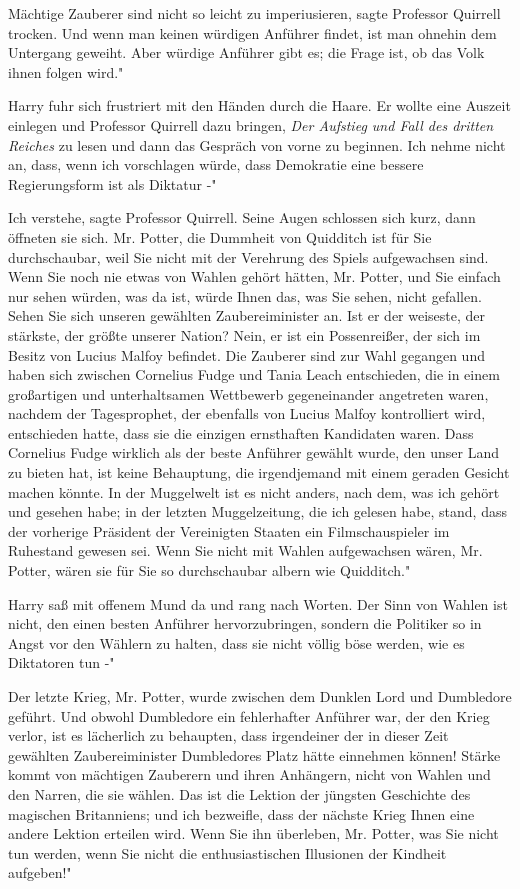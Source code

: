 \glqq{}Mächtige Zauberer sind nicht so leicht zu imperiusieren\grqq{}, sagte
Professor Quirrell trocken. \glqq{}Und wenn man keinen würdigen Anführer findet,
ist man ohnehin dem Untergang geweiht. Aber würdige Anführer gibt es; die Frage
ist, ob das Volk ihnen folgen wird."

Harry fuhr sich frustriert mit den Händen durch die Haare. Er wollte eine
Auszeit einlegen und Professor Quirrell dazu bringen, \emph{Der Aufstieg und
Fall des dritten Reiches} zu lesen und dann das Gespräch von vorne zu beginnen.
\glqq{}Ich nehme nicht an, dass, wenn ich vorschlagen würde, dass Demokratie eine
bessere Regierungsform ist als Diktatur -"

\glqq{}Ich verstehe\grqq{}, sagte Professor Quirrell. Seine Augen schlossen sich
kurz, dann öffneten sie sich. \glqq{}Mr. Potter, die Dummheit von Quidditch ist
für Sie durchschaubar, weil Sie nicht mit der Verehrung des Spiels aufgewachsen
sind. Wenn Sie noch nie etwas von Wahlen gehört hätten, Mr. Potter, und Sie
einfach nur sehen würden, was da ist, würde Ihnen das, was Sie sehen, nicht
gefallen. Sehen Sie sich unseren gewählten Zaubereiminister an. Ist er der
weiseste, der stärkste, der größte unserer Nation? Nein, er ist ein
Possenreißer, der sich im Besitz von Lucius Malfoy befindet. Die Zauberer sind
zur Wahl gegangen und haben sich zwischen Cornelius Fudge und Tania Leach
entschieden, die in einem großartigen und unterhaltsamen Wettbewerb
gegeneinander angetreten waren, nachdem der Tagesprophet, der ebenfalls von
Lucius Malfoy kontrolliert wird, entschieden hatte, dass sie die einzigen
ernsthaften Kandidaten waren. Dass Cornelius Fudge wirklich als der beste
Anführer gewählt wurde, den unser Land zu bieten hat, ist keine Behauptung, die
irgendjemand mit einem geraden Gesicht machen könnte. In der Muggelwelt ist es
nicht anders, nach dem, was ich gehört und gesehen habe; in der letzten
Muggelzeitung, die ich gelesen habe, stand, dass der vorherige Präsident der
Vereinigten Staaten ein Filmschauspieler im Ruhestand gewesen sei. Wenn Sie
nicht mit Wahlen aufgewachsen wären, Mr. Potter, wären sie für Sie so
durchschaubar albern wie Quidditch."

Harry saß mit offenem Mund da und rang nach Worten. \glqq{}Der Sinn von Wahlen
ist nicht, den einen besten Anführer hervorzubringen, sondern die Politiker so
in Angst vor den Wählern zu halten, dass sie nicht völlig böse werden, wie es
Diktatoren tun -"

\glqq{}Der letzte Krieg, Mr. Potter, wurde zwischen dem Dunklen Lord und
Dumbledore geführt. Und obwohl Dumbledore ein fehlerhafter Anführer war, der den
Krieg verlor, ist es lächerlich zu behaupten, dass irgendeiner der in dieser
Zeit gewählten Zaubereiminister Dumbledores Platz hätte einnehmen können! Stärke
kommt von mächtigen Zauberern und ihren Anhängern, nicht von Wahlen und den
Narren, die sie wählen. Das ist die Lektion der jüngsten Geschichte des
magischen Britanniens; und ich bezweifle, dass der nächste Krieg Ihnen eine
andere Lektion erteilen wird. Wenn Sie ihn überleben, Mr. Potter, was Sie nicht
tun werden, wenn Sie nicht die enthusiastischen Illusionen der Kindheit
aufgeben!"

